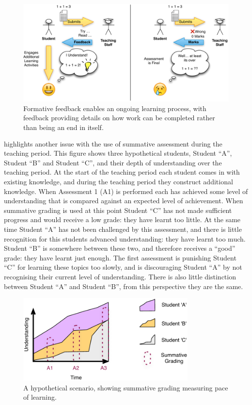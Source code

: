 \begin{figure}[h]
	\centering
	\includegraphics[width=\textwidth]{FormativeLearning}
	\caption{Formative feedback enables an ongoing learning process, with feedback providing details on how work can be completed rather than being an end in itself.}
	\label{fig:formative_learning}
\end{figure}



 highlights another issue with the use of summative assessment during the teaching period. This figure shows three hypothetical students, Student ``A'', Student ``B'' and Student ``C'', and their depth of understanding over the teaching period. At the start of the teaching period each student comes in with existing knowledge, and during the teaching period they construct additional knowledge. When Assessment 1 (A1) is performed each has achieved some level of understanding that is compared against an expected level of achievement. When summative grading is used at this point Student ``C'' has not made sufficient progress and would receive a low grade: they have learnt too little. At the same time Student ``A'' has not been challenged by this assessment, and there is little recognition for this students advanced understanding: they have learnt too much. Student ``B'' is somewhere between these two, and therefore receives a ``good'' grade: they have learnt just enough. The first assessment is punishing Student ``C'' for learning these topics too slowly, and is discouraging Student ``A'' by not recognising their current level of understanding. There is also little distinction between Student ``A'' and Student ``B'', from this perspective they are the same.

\begin{figure}[h]
	\centering
	\includegraphics[width=0.8\textwidth]{PaceOfLearning}
	\caption{A hypothetical scenario, showing summative grading measuring pace of learning.}
	\label{fig:pace}
\end{figure}

